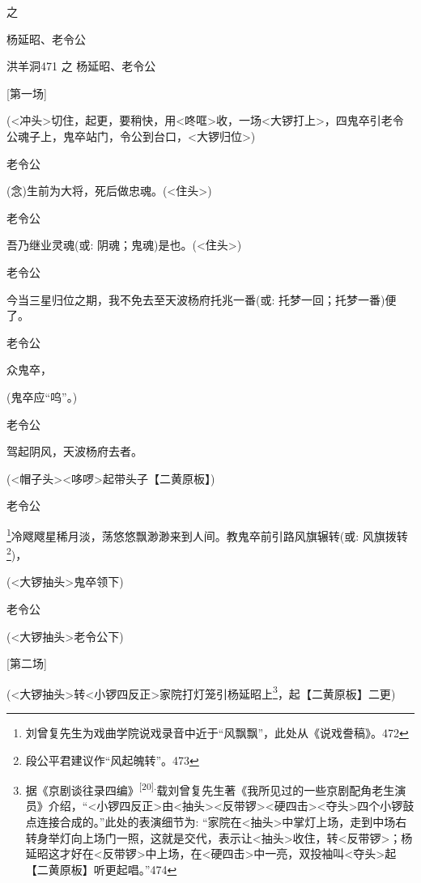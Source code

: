 {{{{之

杨延昭、老令公}{洪羊洞471 之 杨延昭、老令公}}\label{ux6d2aux7f8aux6d1e-ux4e4b-ux6768ux5ef6ux662dux8001ux4ee4ux516c}}

{{[}第一场{]}}

{(\textless{}冲头\textgreater{}切住，起更，要稍快，用\textless{}咚哐\textgreater{}收，一场\textless{}大锣打上\textgreater{}，四鬼卒引老令公魂子上，鬼卒站门，令公到台口，\textless{}大锣归位\textgreater{})}

{老令公

({\akai 念})生前为大将，死后做忠魂。(\textless{}住头\textgreater{})}

{老令公

吾乃继业灵魂({\akai 或}: 阴魂；鬼魂)是也。(\textless{}住头\textgreater{})}

{老令公

今当三星归位之期，我不免去至天波杨府托兆一番({\akai 或}: 托梦一回；托梦一番)便了。}

{老令公\hspace{20pt}~

众鬼卒，}

{(鬼卒应``呜''。)}

{老令公\hspace{20pt}~

驾起阴风，天波杨府去者。}

{(\textless{}帽子头\textgreater{}\textless{}哆啰\textgreater{}起带头子【{\akai 二黄原板}】)}

{老令公

\footnote{ 刘曾复先生为戏曲学院说戏录音中近于``{风飘飘}''，此处从《说戏誊稿》。{472}}{冷飕飕星稀月淡，荡悠悠飘渺渺来到人间。教鬼卒前引路风旗辗转({\akai 或}: 风旗拨转}\footnote{ 段公平君建议作``风起魄转''。{473}}{)，} }

{(\textless{}大锣抽头\textgreater{}鬼卒领下)}

{老令公\hspace{20pt}~

 }

{(\textless{}大锣抽头\textgreater{}老令公下)}

{[}第二场{]}

({\textless{}大锣抽头\textgreater{}转\textless{}小锣四反正\textgreater{}家院打灯笼引杨延昭上}\footnote{ 据《京剧谈往录四编》\textsuperscript{{[}20{]}.}载刘曾复先生著《我所见过的一些京剧配角老生演员》介绍，``{\textless{}小锣四反正\textgreater{}由\textless{}抽头\textgreater{}\textless{}反带锣\textgreater{}\textless{}硬四击\textgreater{}\textless{}夺头\textgreater{}四个小锣鼓点连接合成的。''}此处的表演细节为: {``家院在\textless{}抽头\textgreater{}中掌灯上场，走到中场右转身举灯向上场门一照，这就是交代，表示让\textless{}抽头\textgreater{}收住，转\textless{}反带锣\textgreater{}；杨延昭这才好在\textless{}反带锣\textgreater{}中上场，在\textless{}硬四击\textgreater{}中一亮，双投袖叫\textless{}夺头\textgreater{}起}【{\akai 二黄原板}】{听更起唱}。''{474}}{，起}【{\akai 二黄原板}】{二更})

}
